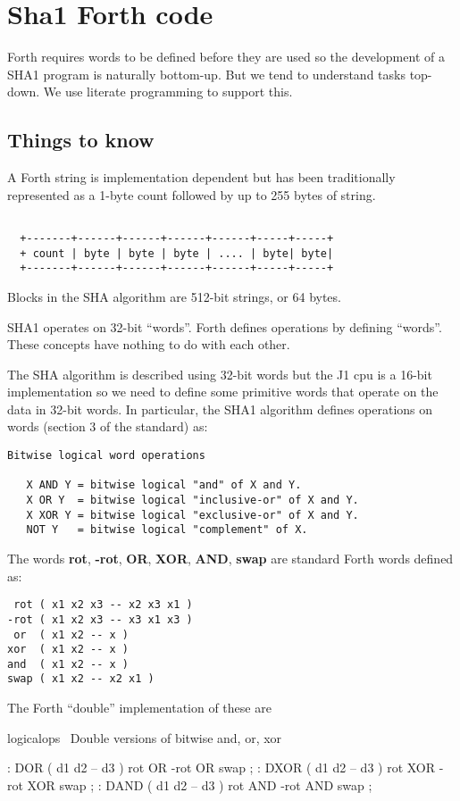 \chapter{Sha1 Forth code \cite{30}}

Forth requires words to be defined before they are used so the 
development of a SHA1 program is naturally bottom-up. But we tend
to understand tasks top-down. We use literate programming to support this.

\section{Things to know}
A Forth string is implementation dependent but has been traditionally
represented as a 1-byte count followed by up to 255 bytes of string.
\begin{verbatim}

  +-------+------+------+------+------+-----+-----+
  + count | byte | byte | byte | .... | byte| byte| 
  +-------+------+------+------+------+-----+-----+

\end{verbatim}

Blocks in the SHA algorithm are 512-bit strings, or 64 bytes.

SHA1 operates on 32-bit ``words''. Forth defines operations by defining
``words''. These concepts have nothing to do with each other. 

The SHA algorithm is described using 32-bit words but the J1 cpu is
a 16-bit implementation so we need to define some primitive words that
operate on the data in 32-bit words. In particular, the SHA1 algorithm
defines operations on words (section 3 of the standard) as:
\begin{verbatim}
Bitwise logical word operations

   X AND Y = bitwise logical "and" of X and Y.
   X OR Y  = bitwise logical "inclusive-or" of X and Y.
   X XOR Y = bitwise logical "exclusive-or" of X and Y.
   NOT Y   = bitwise logical "complement" of X.
\end{verbatim}

The words {\bf rot}, {\bf -rot}, {\bf OR}, {\bf XOR}, {\bf AND}, {\bf swap}
are standard Forth words defined as:
\begin{verbatim}
 rot ( x1 x2 x3 -- x2 x3 x1 )
-rot ( x1 x2 x3 -- x3 x1 x3 )
 or  ( x1 x2 -- x )
xor  ( x1 x2 -- x )
and  ( x1 x2 -- x )
swap ( x1 x2 -- x2 x1 )
\end{verbatim}

The Forth ``double'' implementation of these are
\begin{chunk}{logicalops}
\ Double versions of bitwise and, or, xor
 
: DOR ( d1 d2 -- d3 )
  rot OR -rot OR swap ;
: DXOR ( d1 d2 -- d3 )
  rot XOR -rot XOR swap ;
: DAND ( d1 d2 -- d3 ) 
  rot AND -rot AND swap ;
  
\end{chunk}

